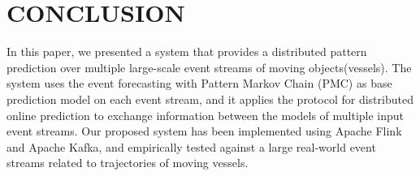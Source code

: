 
\section{CONCLUSION}
\label{sec:concl}
In this paper, we presented a system that provides  a distributed pattern prediction over multiple large-scale event streams of moving objects(vessels). The system uses the event forecasting with Pattern Markov Chain (PMC) \cite{alevizos2017event} as base prediction model on each event stream, and it applies the protocol for distributed online prediction \cite{kamp2014communication} to exchange information between the models of multiple input event streams.  Our proposed system has been implemented using Apache Flink and Apache Kafka, and empirically tested against a large real-world event streams related to trajectories of moving vessels.